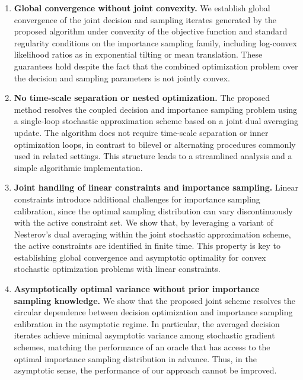 \documentclass[11pt,a4paper]{article}
\theoremstyle{definition}
\begin{document}
\begin{enumerate}
\item \textbf{Global convergence without joint convexity.}
We establish global convergence of the joint decision and sampling iterates generated by the proposed algorithm under convexity of the objective function and standard regularity conditions on the importance sampling family, including log-convex likelihood ratios as in exponential tilting or mean translation. These guarantees hold despite the fact that the combined optimization problem over the decision and sampling parameters is not jointly convex. 


\item \textbf{No time-scale separation or nested optimization.}
The proposed method resolves the coupled decision and importance sampling problem using a single-loop stochastic approximation scheme based on a joint dual averaging update. The algorithm does not require time-scale separation or inner optimization loops, in contrast to bilevel or alternating procedures commonly used in related settings. This structure leads to a streamlined analysis and a simple algorithmic implementation.

\item \textbf{Joint handling of linear constraints and importance sampling.}
Linear constraints introduce additional challenges for importance sampling calibration, since the optimal sampling distribution can vary discontinuously with the active constraint set. We show that, by leveraging a variant of Nesterov’s dual averaging within the joint stochastic approximation scheme, the active constraints are identified in finite time. This property is key to establishing global convergence and asymptotic optimality for convex stochastic optimization problems with linear constraints.

\item \textbf{Asymptotically optimal variance without prior importance sampling knowledge.}
We show that the proposed joint scheme resolves the circular dependence between decision optimization and importance sampling calibration in the asymptotic regime. In particular, the averaged decision iterates achieve minimal asymptotic variance among stochastic gradient schemes, matching the performance of an oracle that has access to the optimal importance sampling distribution in advance. Thus, in the asymptotic sense, the performance of our approach cannot be improved.
\end{enumerate}
\end{document}
